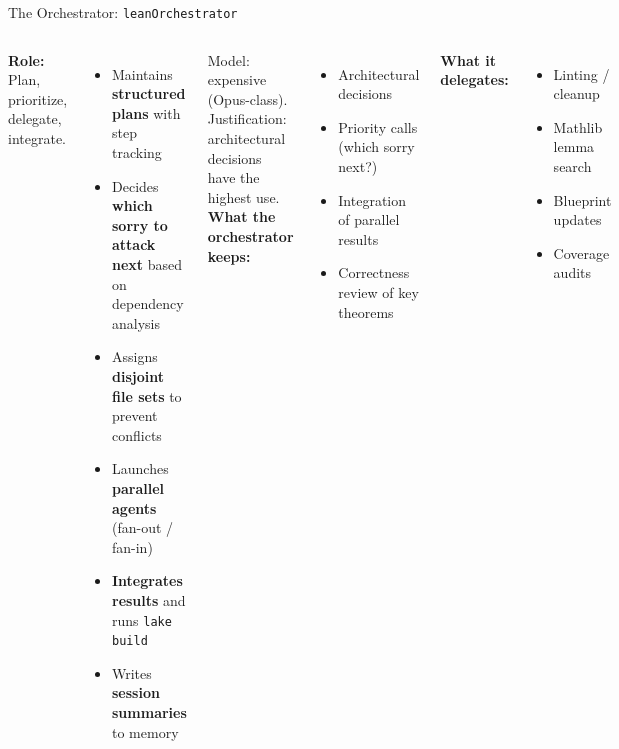 \documentclass[aspectratio=169,10pt]{beamer}
\begin{document}
\begin{frame}{The Orchestrator: \texttt{leanOrchestrator}}
    \begin{columns}[T]
        \textcolor{leangreen}{\textbf{Role:}} Plan, prioritize, delegate, integrate.
        \vspace{0.3em}
        \begin{itemize}
            \item Maintains \textbf{structured plans} with step tracking
            \item Decides \textbf{which sorry to attack next} based on dependency analysis
            \item Assigns \textbf{disjoint file sets} to prevent conflicts
            \item Launches \textbf{parallel agents} (fan-out / fan-in)
            \item \textbf{Integrates results} and runs \texttt{lake build}
            \item Writes \textbf{session summaries} to memory
        \end{itemize}
        \vspace{0.3em}
        \textcolor{dimwhite}{\footnotesize Model: expensive (Opus-class). Justification: architectural decisions have the highest use.}
        \textcolor{amber}{\textbf{What the orchestrator keeps:}}
        \begin{itemize}
            \item Architectural decisions
            \item Priority calls (which sorry next?)
            \item Integration of parallel results
            \item Correctness review of key theorems
        \end{itemize}
        \vspace{0.4em}
        \textcolor{amber}{\textbf{What it delegates:}}
        \begin{itemize}
            \item Linting / cleanup
            \item Mathlib lemma search
            \item Blueprint updates
            \item Coverage audits
        \end{itemize}
    \end{columns}
\end{frame}
\end{document}
